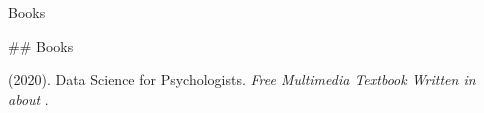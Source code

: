 

\begin{rSection}{\textrm{Books}}%
\begin{etaremune}

## Books
\item  \meb (2020). Data Science for Psychologists. \textit{Free Multimedia Textbook Written in \R about \R}. 

\end{etaremune}\end{rSection}%
